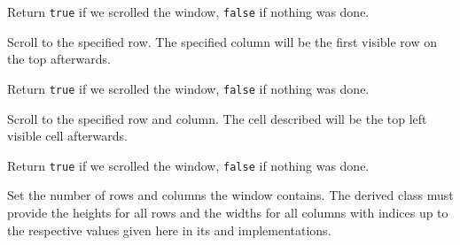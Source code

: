 Return {\tt true} if we scrolled the window, {\tt false} if nothing was done.


\label{wxhvscrolledwindowscrolltorow}


Scroll to the specified row. The specified column will be the first visible row
on the top afterwards.

Return {\tt true} if we scrolled the window, {\tt false} if nothing was done.


\label{wxhvscrolledwindowscrolltorowcolumn}


Scroll to the specified row and column. The cell described will be the top left
visible cell afterwards.

Return {\tt true} if we scrolled the window, {\tt false} if nothing was done.


\label{wxhvscrolledwindowsetrowcolumncounts}


Set the number of rows and columns the window contains. The derived class must
provide the heights for all rows and the widths for all columns with indices up
to the respective values given here in its 
 and 
implementations.
